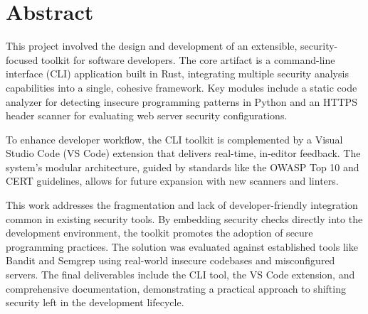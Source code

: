 %
%
\chapter{Abstract}
\begin{SingleSpace}
This project involved the design and development of an extensible, security-focused toolkit for software developers. The core artifact is a command-line interface (CLI) application built in Rust, integrating multiple security analysis capabilities into a single, cohesive framework. Key modules include a static code analyzer for detecting insecure programming patterns in Python and an HTTPS header scanner for evaluating web server security configurations.

To enhance developer workflow, the CLI toolkit is complemented by a Visual Studio Code (VS Code) extension that delivers real-time, in-editor feedback. The system's modular architecture, guided by standards like the OWASP Top 10 and CERT guidelines, allows for future expansion with new scanners and linters.

This work addresses the fragmentation and lack of developer-friendly integration common in existing security tools. By embedding security checks directly into the development environment, the toolkit promotes the adoption of secure programming practices. The solution was evaluated against established tools like Bandit and Semgrep using real-world insecure codebases and misconfigured servers. The final deliverables include the CLI tool, the VS Code extension, and comprehensive documentation, demonstrating a practical approach to shifting security left in the development lifecycle.
\end{SingleSpace}
